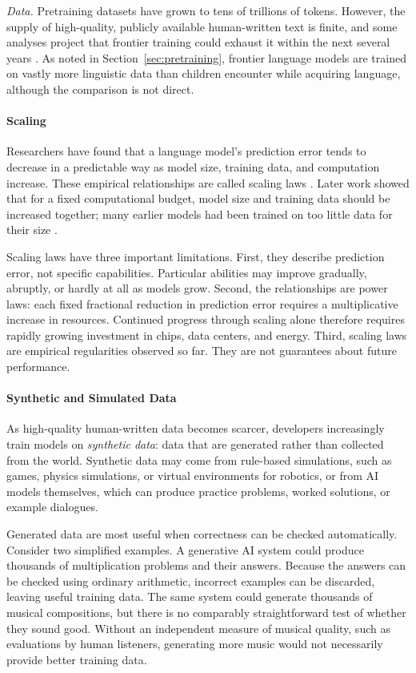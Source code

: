 \documentclass[11pt]{article}
\begin{document}
\textit{Data.} Pretraining datasets have grown to tens of trillions of tokens. However, the supply of high-quality, publicly available human-written text is finite, and some analyses project that frontier training could exhaust it within the next several years \citep{Villalobos2024Data}.
As noted in Section~\ref{sec:pretraining}, frontier language models are trained on vastly more linguistic data than children encounter while acquiring language, although the comparison is not direct.
\paragraph{Scaling}

Researchers have found that a language model's prediction error tends to decrease in a predictable way as model size, training data, and computation increase. These empirical relationships are called scaling laws \citep{Kaplan2020Scaling}. Later work showed that for a fixed computational budget, model size and training data should be increased together; many earlier models had been trained on too little data for their size \citep{Hoffmann2022Chinchilla}.

Scaling laws have three important limitations. First, they describe prediction error, not specific capabilities. Particular abilities may improve gradually, abruptly, or hardly at all as models grow. Second, the relationships are power laws:
each fixed fractional reduction in prediction error requires a multiplicative increase in resources. Continued progress through scaling alone therefore requires rapidly growing investment in chips, data centers, and energy. Third, scaling laws are empirical regularities observed so far. They are not guarantees about future performance.

\paragraph{Synthetic and Simulated Data}

As high-quality human-written data becomes scarcer, developers increasingly train models on \emph{synthetic data}: data that are generated rather than collected from the world. Synthetic data may come from rule-based simulations, such as games, physics simulations, or virtual environments for robotics, or from AI models themselves, which can produce practice problems, worked solutions, or example dialogues.

Generated data are most useful when correctness can be checked automatically.
Consider two simplified examples. A generative AI system could produce thousands of multiplication problems and their answers. Because the answers can be checked using ordinary arithmetic, incorrect examples can be discarded, leaving useful training data. The same system could generate thousands of musical compositions, but there is no comparably straightforward test of whether they sound good. Without an independent measure of musical quality, such as evaluations by human listeners, generating more music would not necessarily provide better training data.
\end{document}
